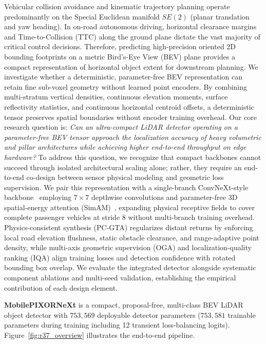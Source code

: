 Vehicular collision avoidance and kinematic trajectory planning operate predominantly on the Special Euclidean manifold $SE(2)$ (planar translation and yaw heading). In on-road autonomous driving, horizontal clearance margins and Time-to-Collision (TTC) along the ground plane dictate the vast majority of critical control decisions. Therefore, predicting high-precision oriented 2D bounding footprints on a metric Bird's-Eye View (BEV) plane provides a compact representation of horizontal object extent for downstream planning. We investigate whether a deterministic, parameter-free BEV representation can retain fine sub-voxel geometry without learned point encoders. By combining multi-stratum vertical densities, continuous elevation moments, surface reflectivity statistics, and continuous horizontal centroid offsets, a deterministic tensor preserves spatial boundaries without encoder training overhead. Our core research question is: \textit{Can an ultra-compact LiDAR detector operating on a parameter-free BEV tensor approach the localization accuracy of heavy volumetric and pillar architectures while achieving higher end-to-end throughput on edge hardware?} To address this question, we recognize that compact backbones cannot succeed through isolated architectural scaling alone; rather, they require an end-to-end co-design between sensor physical modeling and geometric loss supervision. We pair this representation with a single-branch ConvNeXt-style backbone~\cite{liu2022convnext} employing $7 \times 7$ depthwise convolutions and parameter-free 3D spatial-energy attention (SimAM)~\cite{yang2021simam}, expanding physical receptive fields to cover complete passenger vehicles at stride 8 without multi-branch training overhead. Physics-consistent synthesis (PC-GTA) regularizes distant returns by enforcing local road elevation flushness, static obstacle clearance, and range-adaptive point density, while multi-axis geometric supervision (OGA) and localization-quality ranking (IQA) align training losses and detection confidence with rotated bounding box overlap. We evaluate the integrated detector alongside systematic component ablations and multi-seed validation, establishing the empirical contribution of each design element.

\textbf{MobilePIXORNeXt} is a compact, proposal-free, multi-class BEV LiDAR object detector with $753{,}569$ deployable detector parameters ($753{,}581$ trainable parameters during training including 12 transient loss-balancing logits). Figure~\ref{fig:r37_overview} illustrates the end-to-end pipeline.

